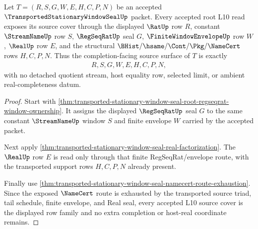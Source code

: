 \begin{theorem}
\label{thm:transported-stationary-window-seal-root-l10-source-cover}
Let $T=(R,S,G,W,E,H,C,P,N)$ be an accepted $\TransportedStationaryWindowSealUp$ packet. Every accepted root L10 read exposes its source cover through the displayed $\RatUp$ row $R$, constant $\StreamNameUp$ row $S$, $\RegSeqRatUp$ seal $G$, $\FiniteWindowEnvelopeUp$ row $W$, $\RealUp$ row $E$, and the structural $\BHist/\hsame/\Cont/\Pkg/\NameCert$ rows $H,C,P,N$. Thus the completion-facing source surface of $T$ is exactly
$$
\begin{aligned}
  R,S,G,W,E,H,C,P,N,
\end{aligned}
$$
with no detached quotient stream, host equality row, selected limit, or ambient real-completeness datum.
\end{theorem}
\begin{proof}
Start with \autoref{thm:transported-stationary-window-seal-root-regseqrat-window-ownership}. It assigns the displayed $\RegSeqRatUp$ seal $G$ to the same constant $\StreamNameUp$ window $S$ and finite envelope $W$ carried by the accepted packet.

Next apply \autoref{thm:transported-stationary-window-seal-real-factorization}. The $\RealUp$ row $E$ is read only through that finite RegSeqRat/envelope route, with the transported support rows $H,C,P,N$ already present.

Finally use \autoref{thm:transported-stationary-window-seal-namecert-route-exhaustion}. Since the exposed $\NameCert$ route is exhausted by the transported source triad, tail schedule, finite envelope, and Real seal, every accepted L10 source cover is the displayed row family and no extra completion or host-real coordinate remains.
\end{proof}

